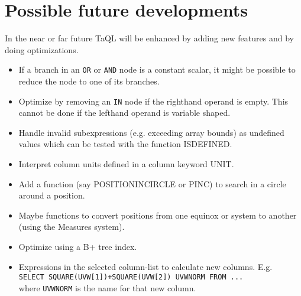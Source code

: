 \section{Possible future developments}
In the near or far future TaQL will be enhanced by adding new
features and by doing optimizations.
\begin{itemize}
  \item If a branch in an \texttt{OR} or \texttt{AND} node is a
    constant scalar, it might be possible to reduce the node to
    one of its branches.
  \item Optimize by removing an \texttt{IN} node if the righthand
    operand is empty. This cannot be done if the lefthand operand
    is variable shaped.
  \item Handle invalid subexpressions (e.g. exceeding array bounds)
    as undefined values
    which can be tested with the function ISDEFINED.
  \item Interpret column units defined in a column keyword UNIT.
  \item Add a function (say POSITIONINCIRCLE or PINC) to search in a circle
       around a position.
  \item Maybe functions to convert positions from one equinox or system
       to another (using the Measures system).
  \item Optimize using a B+ tree index.
  \item Expressions in the selected column-list to calculate new columns. E.g.
       \\\texttt{SELECT SQUARE(UVW[1])+SQUARE(UVW[2]) UVWNORM FROM ...}
       \\where \texttt{UVWNORM} is the name for that new column.
\end{itemize}
